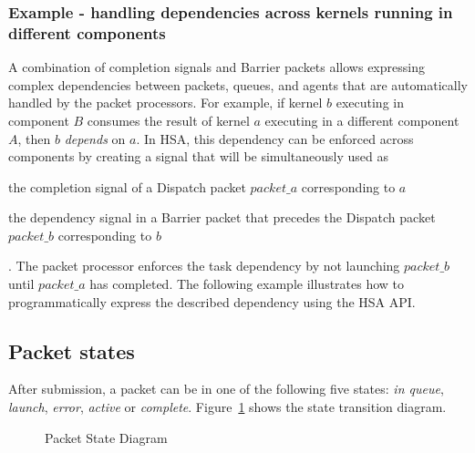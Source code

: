 \documentclass[final,oneside]{book}
\begin{document}
\subsubsection{Example - handling dependencies across kernels running in
  different components}
A combination of completion signals and Barrier packets allows expressing
complex dependencies between packets, queues, and agents that are automatically
handled by the packet processors. For example, if kernel $b$ executing in
component $B$ consumes the result of kernel $a$ executing in a different
component $A$, then $b$ \textit{depends} on $a$. In HSA, this dependency can be
enforced across components by creating a signal that will be simultaneously used
as \begin{inparaenum}[I\upshape)] \item the completion signal of a Dispatch
  packet $packet\_a$ corresponding to $a$ \item the dependency signal in a
  Barrier packet that precedes the Dispatch packet $packet\_b$ corresponding to
  $b$\end{inparaenum}. The packet processor enforces the task dependency by not
launching $packet\_b$ until $packet\_a$ has completed. The following example
illustrates how to programmatically express the described dependency using the
HSA API.


\subsection{Packet states}\label{packet-states}

After submission, a packet can be in one of the following five states:
\emph{in queue}, \emph{launch}, \emph{error}, \emph{active} or
\emph{complete}. Figure~\ref{fig:packetstate} shows the state transition
diagram.

\begin{figure}[t]
  \centering
  \scriptsize
{}
  \centering
  \caption{Packet State Diagram}
  \label{fig:packetstate}
\end{figure}
\end{document}

